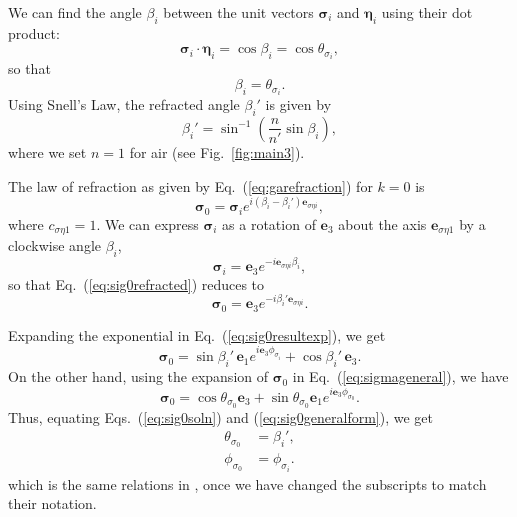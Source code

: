 \documentclass[a4paper,twocolumn,superscriptaddress]{revtex4-1}
\begin{document}
{We can find the angle $\beta_i$ between the unit vectors $\bm  \sigma_i$ and 
$\bm  \eta_i$ using their dot product:
\begin{equation} 
  \label{eq:sigmaetadotsimp}
  \bm  \sigma_i \cdot \bm  \eta_i = 
  \cos \beta_i = \cos \theta_{ \sigma_i } ,
\end{equation}
so that
\begin{equation} 
  \label{eq:beta1}
  \beta_i = \theta_{ \sigma_i } .
\end{equation}
Using Snell's Law, the refracted angle $\beta_i'$ is given by
\begin{equation}
  \label{eq:beta1snells}
  \beta_i' = 
  \sin^{-1} \left (\frac{n}{n'} \sin \beta_i \right) ,
\end{equation}
where we set $n=1$ for air (see Fig.~\ref{fig:main3}).

The law of refraction as given by Eq.~(\ref{eq:garefraction}) for $k=0$ is
\begin{equation} 
  \label{eq:sig0refracted}
  \bm \sigma_0 = 
  \bm  \sigma_i e^{i (\beta_i - \beta_i' ) \mathbf e_{\sigma \eta i}} ,
\end{equation}
where $c_{\sigma \eta 1} = 1$. 
We can express $\bm  \sigma_i$ as a rotation of $\mathbf e_3$ about the 
axis $\mathbf e_{\sigma \eta 1}$ by a clockwise angle $\beta_i$,
\begin{equation}
  \label{eq:signeg1exp}
  \bm  \sigma_i = 
  \mathbf e_3 e^{- i \mathbf e_{\sigma \eta i} \beta_i} ,
\end{equation}
so that Eq.~(\ref{eq:sig0refracted}) reduces to
\begin{equation} 
  \label{eq:sig0resultexp}
  \bm \sigma_0 = 
  \mathbf e_3 e^{- i \beta_i' \mathbf e_{\sigma \eta i}} .
\end{equation}

Expanding the exponential in Eq.~(\ref{eq:sig0resultexp}), we get
\begin{equation} 
  \label{eq:sig0soln}
  \bm \sigma_0 = 
  \sin \beta_i' \, \mathbf e_1 e^{ i \mathbf e_3 \phi_{ \sigma_i } } + 
  \cos \beta_i' \, \mathbf e_3 .
\end{equation}
On the other hand, using the expansion of $\bm \sigma_0$ in 
Eq.~(\ref{eq:sigmageneral}), we have
\begin{equation} 
  \label{eq:sig0generalform}
  \bm \sigma_{0} = 
  \cos \theta_{ \sigma_0 } \mathbf e_3 + 
  \sin \theta_{ \sigma_0 } \mathbf e_1 e^{i \mathbf e_3 \phi_{ \sigma_0 }} .
\end{equation}
Thus, equating Eqs.~(\ref{eq:sig0soln}) and (\ref{eq:sig0generalform}), we get
\begin{subequations} 
  \label{eq:anglesigmarelations}
  \begin{align} 
    \label{eq:thetasigma0} 
    \theta_{ \sigma_0 } &= \beta_i' ,
    \\
    \label{eq:phisigma0} 
    \phi_{ \sigma_0 } &= \phi_{ \sigma_i } .
  \end{align}
\end{subequations}
which is the same relations in \cite{sugonSPP}, once we have changed the subscripts 
to match their notation.

}
\end{document}
